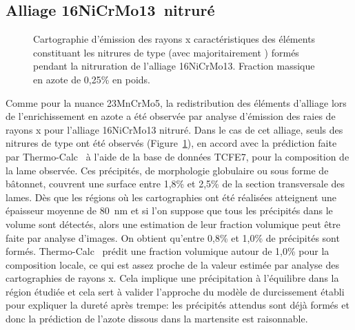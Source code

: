 \subsection{Alliage 16NiCrMo13 nitruré}

\begin{figure}[!b]
  \centering{}
  
  \caption{\label{fig:chemical-maps-aero}Cartographie d'émission des rayons x caractéristiques des éléments constituant les nitrures de type  (avec  majoritairement ) formés pendant la nitruration de l'alliage 16NiCrMo13. Fraction massique en azote de 0,25\% en poids.}
\end{figure}

Comme pour la nuance 23MnCrMo5, la redistribution des éléments d'alliage lors de l'enrichissement en azote a été observée par analyse d'émission des raies de rayons x pour l'alliage 16NiCrMo13 nitruré. Dans le cas de cet alliage, seuls des nitrures de type  ont été observés (Figure~\ref{fig:chemical-maps-aero}), en accord avec la prédiction faite par Thermo-Calc~\cite{Andersson2002,Borgenstam2000} à l'aide de la base de données TCFE7, pour la composition de la lame observée.  Ces précipités, de morphologie globulaire ou sous forme de bâtonnet, couvrent une surface entre 1,8\% et 2,5\% de la section transversale des lames. Dès que les régions où les cartographies ont été réalisées atteignent une épaisseur moyenne de \SI{80}{\nano\metre} et si l'on suppose que tous les précipités  dans le volume sont détectés, alors une estimation de leur fraction volumique peut être faite par analyse d'images. On obtient qu'entre 0,8\% et 1,0\% de précipités sont formés. Thermo-Calc~\cite{Andersson2002,Borgenstam2000} prédit une fraction volumique autour de 1,0\% pour la composition locale, ce qui est assez proche de la valeur estimée par analyse des cartographies de rayons x. Cela implique une précipitation à l'équilibre dans la région étudiée et cela sert à valider l'approche du modèle de durcissement établi pour expliquer la dureté après trempe: les précipités attendus sont déjà formés et donc la prédiction de l'azote dissous dans la martensite est raisonnable.

